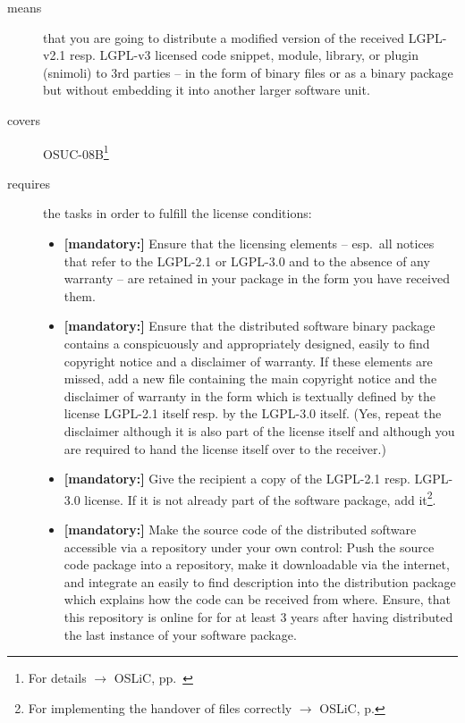 \begin{description}
\item[means] that you are going to distribute a modified version of the received
LGPL-v2.1 resp. LGPL-v3 licensed code snippet, module, library, or plugin
(snimoli) to 3rd parties -- in the form of binary files or as a binary package
but without embedding it into another larger software unit.
\item[covers] OSUC-08B\footnote{For details $\rightarrow$ OSLiC, pp.\ \pageref{OSUC-08-DEF}}
\item[requires] the tasks in order to fulfill the license conditions:
\begin{itemize}

  \item \textbf{[mandatory:]} Ensure that the licensing elements -- esp.\ all
  notices that refer to the LGPL-2.1 or LGPL-3.0 and to the absence of any
  warranty -- are retained in your package in the form you have received them.

  \item \textbf{[mandatory:]} Ensure that the distributed software binary
  package contains a conspicuously and appropriately designed, easily to find
  copyright notice and a disclaimer of warranty. If these elements are missed,
  add a new file containing the main copyright notice and the disclaimer of
  warranty in the form which is textually defined by the license LGPL-2.1 itself
  resp. by the LGPL-3.0 itself. (Yes, repeat the disclaimer although it is also
  part of the license itself and although you are required to hand the license
  itself over to the receiver.)
  
  \item \textbf{[mandatory:]} Give the recipient a copy of the LGPL-2.1 resp.
  LGPL-3.0 license. If it is not already part of the software package, add
  it\footnote{For implementing the handover of files correctly $\rightarrow$
  OSLiC, p. \pageref{DistributingFilesHint}}.

  \item \textbf{[mandatory:]} Make the source code of the distributed software
  accessible via a repository under your own control: Push the source code
  package into a repository, make it downloadable via the internet, and
  integrate an easily to find description into the distribution package which
  explains how the code can be received from where. Ensure, that this repository
  is online for for at least 3 years after having distributed the last instance
  of your software package.
  

\end{itemize}
\end{description}
